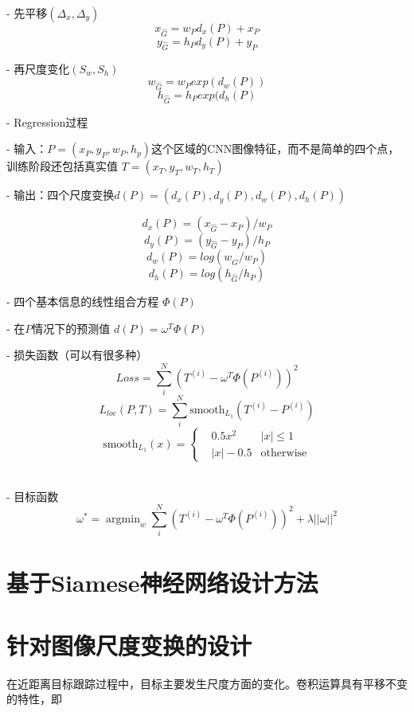 - 先平移$(\Delta_x, \Delta_y)$
$$x_{\hat{G}} = w_{P}d_x(P)+x_P$$
$$y_{\hat{G}} = h_{P}d_y(P)+y_P$$

- 再尺度变化$(S_w, S_h)$
$$w_{\hat{G}}=w_{P}exp(d_w(P))$$
$$h_{\hat{G}}=h_{P}exp(d_h(P)$$

- Regression过程

- 输入：$P=(x_P, y_P, w_P, h_p)$这个区域的CNN图像特征，而不是简单的四个点，训练阶段还包括真实值 $T=(x_T, y_T, w_T, h_T)$

- 输出：四个尺度变换$d(P)=(d_x(P), d_y(P), d_w(P), d_h(P))$

$$d_x(P)=(x_{\hat{G}}-x_P)/w_P$$
$$d_y(P)=(y_{\hat{G}}-y_P)/h_P$$
$$d_w(P)=log(w_{\hat{G}}/w_P)$$
$$d_h(P)=log(h_{\hat{G}}/h_P)$$

- 四个基本信息的线性组合方程 $\Phi(P)$

- 在$P$情况下的预测值 $d(P)=\omega^T\Phi(P)$

- 损失函数（可以有很多种）
$$Loss=\sum^N_i(T^{(i)}-\omega^T\Phi(P^{(i)}))^2$$
$$L_{loc}(P,T) = \sum_{i}^N\text{smooth}_{L_1}(T^{(i)}-P^{(i)})$$
$$\text{smooth}_{L_1}(x) = \left \{ \begin{aligned} &0.5x^2 & |x| \le 1\\ &|x|-0.5 & \text{otherwise}\end{aligned} \right.$$
​

- 目标函数
$$\omega^*=\mathop{\arg\min}_{w}\sum^N_i(T^{(i)}-\omega^T\Phi(P^{(i)}))^2+\lambda||\omega||^2$$



\section{基于Siamese神经网络设计方法}

\section{针对图像尺度变换的设计}
在近距离目标跟踪过程中，目标主要发生尺度方面的变化。卷积运算具有平移不变的特性，即



\section{}